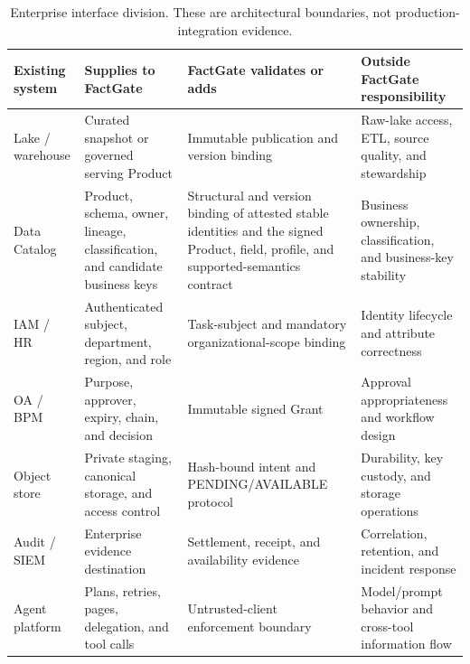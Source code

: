 \documentclass[journal,onecolumn]{IEEEtran}
\begin{document}
\begin{table}[h]
\centering
\caption{Enterprise interface division. These are architectural boundaries,
not production-integration evidence.}
\label{tab:supp-enterprise-interfaces}
\scriptsize
\setlength{\tabcolsep}{3pt}
\begin{tabular}{L{0.13\textwidth}L{0.23\textwidth}L{0.27\textwidth}L{0.27\textwidth}}
\toprule
Existing system & Supplies to FactGate & FactGate validates or adds & Outside FactGate responsibility \\
\midrule
Lake / warehouse & Curated snapshot or governed serving Product & Immutable publication and version binding & Raw-lake access, ETL, source quality, and stewardship \\
Data Catalog & Product, schema, owner, lineage, classification, and candidate business keys & Structural and version binding of attested stable identities and the signed Product, field, profile, and supported-semantics contract & Business ownership, classification, and business-key stability \\
IAM / HR & Authenticated subject, department, region, and role & Task-subject and mandatory organizational-scope binding & Identity lifecycle and attribute correctness \\
OA / BPM & Purpose, approver, expiry, chain, and decision & Immutable signed Grant & Approval appropriateness and workflow design \\
Object store & Private staging, canonical storage, and access control & Hash-bound intent and PENDING/AVAILABLE protocol & Durability, key custody, and storage operations \\
Audit / SIEM & Enterprise evidence destination & Settlement, receipt, and availability evidence & Correlation, retention, and incident response \\
Agent platform & Plans, retries, pages, delegation, and tool calls & Untrusted-client enforcement boundary & Model/prompt behavior and cross-tool information flow \\
\bottomrule
\end{tabular}
\end{table}
\end{document}
